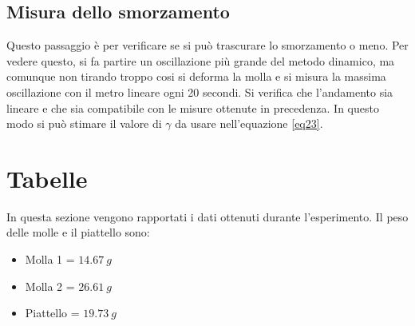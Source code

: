 \documentclass[a4paper]{article}
\begin{document}
\subsection{Misura dello smorzamento}
Questo passaggio è per verificare se si può trascurare lo smorzamento o meno. Per vedere questo, si fa partire un oscillazione più grande del metodo dinamico, ma comunque non tirando troppo cosi si deforma la molla e si misura la massima oscillazione con il metro lineare ogni 20 secondi. Si verifica che l'andamento sia lineare e che sia compatibile con le misure ottenute in precedenza. In questo modo si può stimare il valore di $\gamma$ da usare nell'equazione \ref{eq23}. 

\section{Tabelle}
In questa sezione vengono rapportati i dati ottenuti durante l'esperimento. Il peso delle molle e il piattello sono:
\begin{itemize}
    \item Molla 1 = $\SI{14.67}{g}$
    \item Molla 2 = $\SI{26.61}{g}$
    \item Piattello = $\SI{19.73}{g}$
\end{itemize}
\end{document}
